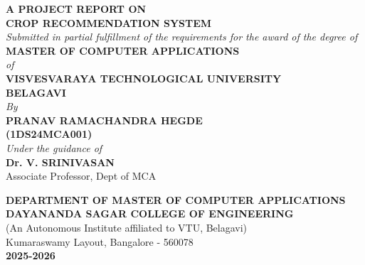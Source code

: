 \documentclass[12pt,a4paper]{report}
\begin{document}
\begin{titlepage}
    \begin{center}
        \vspace*{0.5cm}
        \textbf{\large A PROJECT REPORT ON} \\
        \vspace{0.5cm}
        \textbf{\Huge CROP RECOMMENDATION SYSTEM} \\
        \vspace{1.5cm}
        \textit{Submitted in partial fulfillment of the requirements for the award of the degree of} \\
        \vspace{0.5cm}
        \textbf{\Large MASTER OF COMPUTER APPLICATIONS} \\
        \vspace{0.5cm}
        \textit{of} \\
        \vspace{0.5cm}
        \textbf{\Large VISVESVARAYA TECHNOLOGICAL UNIVERSITY} \\
        \textbf{BELAGAVI} \\
        \vspace{1.5cm}
        \textit{By} \\
        \vspace{0.5cm}
        \textbf{\Large PRANAV RAMACHANDRA HEGDE} \\
        \textbf{(1DS24MCA001)} \\
        \vspace{1.5cm}
        \textit{Under the guidance of} \\
        \vspace{0.5cm}
        \textbf{\Large Dr. V. SRINIVASAN} \\
        Associate Professor, Dept of MCA \\
        \vfill
        
        \begin{center}
        \end{center}
        
        \vspace{0.5cm}
        \textbf{\Large DEPARTMENT OF MASTER OF COMPUTER APPLICATIONS} \\
        \textbf{DAYANANDA SAGAR COLLEGE OF ENGINEERING} \\
        (An Autonomous Institute affiliated to VTU, Belagavi) \\
        Kumaraswamy Layout, Bangalore - 560078 \\
        \vspace{0.5cm}
        \textbf{2025-2026}
    \end{center}
\end{titlepage}
\end{document}
